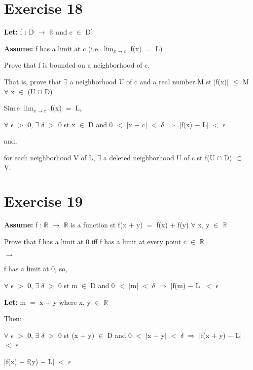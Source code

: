 \documentclass{article}
\newcommand{\mt}[1]{\ensuremath{#1}}
\newcommand\bsc[2][\DefaultOpt]{%
  \def\DefaultOpt{#2}%
  \section[#1]{#2}%
}
\newcommand{\lt}[1]{\textbf{Let: } #1}
\newcommand{\as}[1]{\textbf{Assume: } #1}
\newcommand{\br}{\mt{\mathbb{R}} }       %
\newcommand{\ep}{\mt{\epsilon} }         %
\newcommand{\fa}{\mt{\forall} }          %
\newcommand{\dta}{\mt{\delta} }
\newcommand{\mem}{\mt{\in} }
\newcommand{\exs}{\mt{\exists} }
\newcommand{\sbs}{\mt{\subset} }         %
\newcommand{\lra}{ \mt{\longrightarrow} } %
\newcommand{\rar}{ \mt{\Rightarrow} }     %
\newcommand{\av}[1]{\mt{|}#1\mt{|}}  %
\newcommand{\ps}{\mt{+} }
\newcommand{\ms}{\mt{-} }
\newcommand{\ls}{\mt{<} }
\newcommand{\gr}{\mt{>} }
\newcommand{\lse}{\mt{\leq} }
\newcommand{\eql}{\mt{=} }
\newcommand{\pr}{\mt{^\prime} } 		   %
\newcommand{\limt}[2]{\mt{\displaystyle{\lim_{#1 \to #2}}}}
\newcommand{\inn}{\mt{\cap} }
\begin{document}
\bsc{Exercise 18}{

\lt{f : D \lra \br and c \mem D\pr}

\as{f has a limit at c (i.e. \limt{x}{c} f(x) \eql L)}

Prove that f is bounded on a neighborhood of c.

That is, prove that \exs a neighborhood U of c and a real number M st \av{f(x)} \lse M \fa x \mem (U \inn D)

Since \limt{x}{c} f(x) \eql L,

\fa \ep \gr 0, \exs \dta \gr 0 st x \mem D and 0 \ls \av{x \ms c} \ls \dta \rar \av{f(x) \ms L} \ls \ep

and,

for each neighborhood V of L, \exs a deleted neighborhood U of c st f(U $\cap$ D) \sbs V.





}

\bsc{Exercise 19}{

\as{f : \br \lra \br is a function st f(x \ps y) \eql f(x) \ps f(y) \fa x, y \mem \br}

Prove that f has a limit at 0 iff f has a limit at every point c \mem \br

\lra

f has a limit at 0, so,

\fa \ep \gr 0, \exs \dta \gr 0 st m \mem D and 0 \ls \av{m} \ls \dta \rar \av{f(m) \ms L} \ls \ep

\lt{m \eql x \ps y where x, y \mem \br}

Then:

\fa \ep \gr 0, \exs \dta \gr 0 st (x \ps y) \mem D and 0 \ls \av{x \ps y} \ls \dta \rar \av{f(x \ps y) \ms L} \ls \ep

\av{f(x) \ps f(y) \ms L} \ls \ep

}
\end{document}
